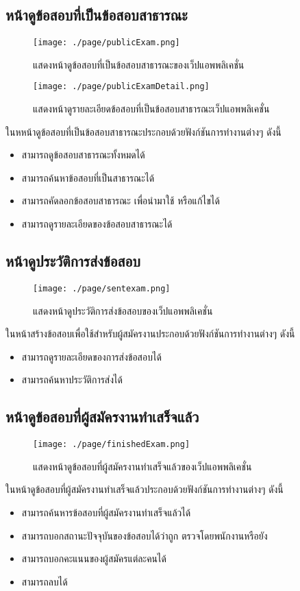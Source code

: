 \subsection{หน้าดูข้อสอบที่เป็นข้อสอบสาธารณะ}
\begin{figure}[H]
  \centering
  \texttt{[image: ./page/publicExam.png]}
  \caption{แสดงหน้าดูข้อสอบที่เป็นข้อสอบสาธารณะของเว็ปแอพพลิเคชั่น}
  \label{Fig:publicExams}
\end{figure}
\begin{figure}[H]
  \centering
  \texttt{[image: ./page/publicExamDetail.png]}
  \caption{แสดงหน้าดูรายละเอียดข้อสอบที่เป็นข้อสอบสาธารณะเว็ปแอพพลิเคชั่น}
  \label{Fig:publicExamDetails}
\end{figure}
ในหหน้าดูข้อสอบที่เป็นข้อสอบสาธารณะประกอบด้วยฟังก์ชันการทำงานต่างๆ ดังนี้
\begin{itemize}
    \item สามารถดูข้อสอบสาธารณะทั้งหมดได้
    \item สามารถค้นหาข้อสอบที่เป็นสาธารณะได้
    \item สามารถคัดลอกข้อสอบสาธารณะ เพื่อนำมาใช้ หรือแก้ไขได้
    \item สามารถดูรายละเอียดของข้อสอบสาธารณะได้
\end{itemize}

\subsection{หน้าดูประวัติการส่งข้อสอบ}
\begin{figure}[H]
  \centering
  \texttt{[image: ./page/sentexam.png]}
  \caption{แสดงหน้าดูประวัติการส่งข้อสอบของเว็ปแอพพลิเคชั่น}
  \label{Fig:sentExam}
\end{figure}
ในหน้าสร้างข้อสอบเพื่อใช้สำหรับผู้สมัครงานประกอบด้วยฟังก์ชันการทำงานต่างๆ ดังนี้
\begin{itemize}
    \item สามารถดูรายละเอียดของการส่งข้อสอบได้
    \item สามารถค้นหาประวัติการส่งได้
\end{itemize}

\subsection{หน้าดูข้อสอบที่ผู้สมัครงานทำเสร็จแล้ว}
\begin{figure}[H]
  \centering
  \texttt{[image: ./page/finishedExam.png]}
  \caption{แสดงหน้าดูข้อสอบที่ผู้สมัครงานทำเสร็จแล้วของเว็ปแอพพลิเคชั่น}
  \label{Fig:finishedExam}
\end{figure}
ในหน้าดูข้อสอบที่ผู้สมัครงานทำเสร็จแล้วประกอบด้วยฟังก์ชันการทำงานต่างๆ ดังนี้
\begin{itemize}
    \item สามารถค้นหารข้อสอบที่ผู้สมัครงานทำเสร็จแล้วได้
    \item สามารถบอกสถานะปัจจุบันของข้อสอบได้ว่าถูก ตรวจโดยพนักงานหรือยัง
    \item สามารถบอกคะแนนของผู้สมัครแต่ละคนได้
    \item สามารถลบได้
\end{itemize}

